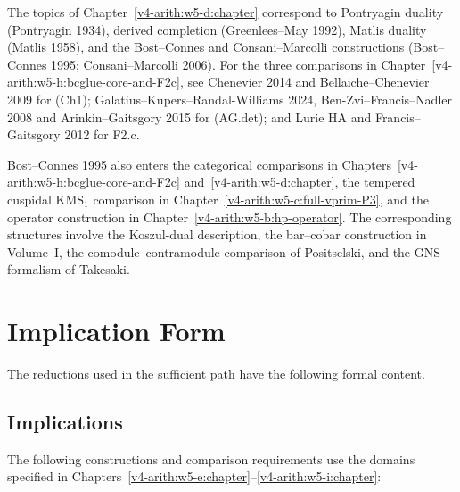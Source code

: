 The topics of Chapter~\ref{v4-arith:w5-d:chapter} correspond to Pontryagin duality
(Pontryagin 1934), derived completion (Greenlees--May 1992),
Matlis duality (Matlis 1958), and the Bost--Connes and
Consani--Marcolli constructions (Bost--Connes 1995;
Consani--Marcolli 2006). For the three comparisons in Chapter~\ref{v4-arith:w5-h:bcglue-core-and-F2c},
see Chenevier 2014 and Bellaiche--Chenevier 2009 for (Ch1);
Galatius--Kupers--Randal-Williams 2024,
Ben-Zvi--Francis--Nadler 2008 and Arinkin--Gaitsgory 2015 for
(AG.det); and Lurie HA and Francis--Gaitsgory 2012 for F2.c.

Bost--Connes 1995 also enters the categorical comparisons in
Chapters~\ref{v4-arith:w5-h:bcglue-core-and-F2c} and~\ref{v4-arith:w5-d:chapter}, the tempered cuspidal KMS\({}_1\) comparison
in Chapter~\ref{v4-arith:w5-c:full-vprim-P3}, and the operator construction in Chapter~\ref{v4-arith:w5-b:hp-operator}.
The corresponding structures involve the Koszul-dual description,
the bar--cobar construction in Volume~I, the
comodule--contramodule comparison of Positselski, and the GNS
formalism of Takesaki.

\section{Implication Form}
\label{v4-arith:w5-synth:form-table}

The reductions used in the sufficient path have the following formal
content.

\subsection{Implications}
\label{v4-arith:w5-synth:upgrades}

The following constructions and comparison requirements use the domains
specified in Chapters~\ref{v4-arith:w5-e:chapter}--\ref{v4-arith:w5-i:chapter}:

